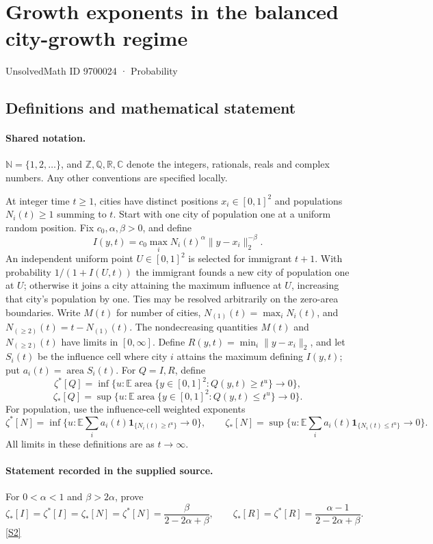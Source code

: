 \documentclass[11pt]{article}
\newcommand{\sref}[2]{\hyperlink{source:#1:#2}{[S#2]}}
\begin{document}
\setcounter{section}{9700023}
\section{Growth exponents in the balanced city-growth regime}\label{9700024}
{\small\sffamily UnsolvedMath ID 9700024 · Probability}
\subsection{Definitions and mathematical statement}

\paragraph{Shared notation.}$\mathbb N=\{1,2,\ldots\}$, and $\mathbb Z,\mathbb Q,\mathbb R,\mathbb C$ denote the integers, rationals, reals and complex numbers. Any other conventions are specified locally.


At integer time $t\ge1$, cities have distinct positions $x_i\in[0,1]^2$ and populations $N_i(t)\ge1$ summing to $t$. Start with one city of population one at a uniform random position. Fix $c_0,\alpha,\beta>0$, and define
\[I(y,t)=c_0\max_i N_i(t)^\alpha\|y-x_i\|_2^{-\beta}.\]
An independent uniform point $U\in[0,1]^2$ is selected for immigrant $t+1$. With probability $1/(1+I(U,t))$ the immigrant founds a new city of population one at $U$; otherwise it joins a city attaining the maximum influence at $U$, increasing that city's population by one. Ties may be resolved arbitrarily on the zero-area boundaries. Write $M(t)$ for number of cities, $N_{(1)}(t)=\max_iN_i(t)$, and $N_{(\ge2)}(t)=t-N_{(1)}(t)$. The nondecreasing quantities $M(t)$ and $N_{(\ge2)}(t)$ have limits in $[0,\infty]$. Define $R(y,t)=\min_i\|y-x_i\|_2$, and let $S_i(t)$ be the influence cell where city $i$ attains the maximum defining $I(y,t)$; put $a_i(t)=\operatorname{area}S_i(t)$. For $Q=I,R$, define
\[\zeta^*[Q]=\inf\{u:\mathbb E\operatorname{area}\{y\in[0,1]^2:Q(y,t)\ge t^u\}\to0\},\]
\[\zeta_*[Q]=\sup\{u:\mathbb E\operatorname{area}\{y\in[0,1]^2:Q(y,t)\le t^u\}\to0\}.\]
For population, use the influence-cell weighted exponents
\[\zeta^*[N]=\inf\{u:\mathbb E\sum_i a_i(t)\mathbf1_{\{N_i(t)\ge t^u\}}\to0\},\qquad
\zeta_*[N]=\sup\{u:\mathbb E\sum_i a_i(t)\mathbf1_{\{N_i(t)\le t^u\}}\to0\}.\]
All limits in these definitions are as $t\to\infty$.
\paragraph{Statement recorded in the supplied source.}
For $0<\alpha<1$ and $\beta>2\alpha$, prove
\[\zeta_*[I]=\zeta^*[I]=\zeta_*[N]=\zeta^*[N]=\frac{\beta}{2-2\alpha+\beta},\qquad
\zeta_*[R]=\zeta^*[R]=\frac{\alpha-1}{2-2\alpha+\beta}.\] \sref{9700024}{2}
\end{document}

